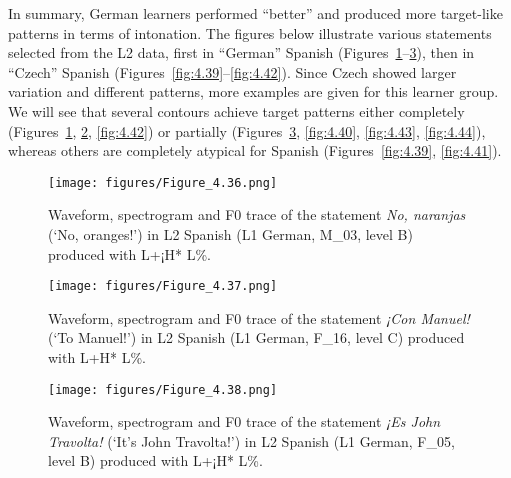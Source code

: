 In summary, German learners performed “better” and produced more target-like patterns in terms of intonation. The figures below illustrate various statements selected from the L2 data, first in “German” Spanish (Figures~\ref{fig:4.36}--\ref{fig:4.38}), then in “Czech” Spanish (Figures~\ref{fig:4.39}--\ref{fig:4.42}). Since Czech showed larger variation and different patterns, more examples are given for this learner group. We will see that several contours achieve target patterns either completely (Figures~\ref{fig:4.36}, \ref{fig:4.37}, \ref{fig:4.42}) or partially (Figures~\ref{fig:4.38}, \ref{fig:4.40}, \ref{fig:4.43}, \ref{fig:4.44}), whereas others are completely atypical for Spanish (Figures~\ref{fig:4.39}, \ref{fig:4.41}).

\begin{figure}


\texttt{[image: figures/Figure\_4.36.png]}


\caption{Waveform, spectrogram and F0 trace of the statement \textit{No, naranjas} (‘No, oranges!’) in L2 Spanish (L1 German, M\_03, level B) produced with L+¡H* L\%.}
\label{fig:4.36}
\end{figure}

\begin{figure}

\texttt{[image: figures/Figure\_4.37.png]}


\caption{Waveform, spectrogram and F0 trace of the statement \textit{¡Con Manuel!} (‘To Manuel!’) in L2 Spanish (L1 German, F\_16, level C) produced with L+H* L\%.}
\label{fig:4.37}
\end{figure}

\begin{figure}


\texttt{[image: figures/Figure\_4.38.png]}


\caption{Waveform, spectrogram and F0 trace of the statement \textit{¡Es John Travolta!} (‘It’s John Travolta!’) in L2 Spanish (L1 German, F\_05, level B) produced with L+¡H* L\%.}
\label{fig:4.38}
\end{figure}

